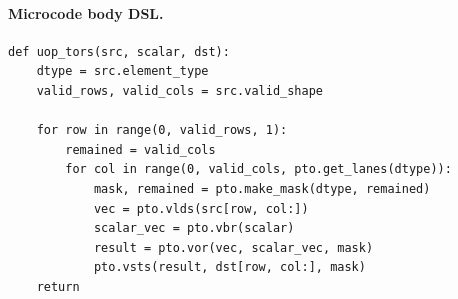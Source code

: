 \paragraph{Microcode body DSL.}
\begin{lstlisting}[style=ptocode]
def uop_tors(src, scalar, dst):
    dtype = src.element_type
    valid_rows, valid_cols = src.valid_shape

    for row in range(0, valid_rows, 1):
        remained = valid_cols
        for col in range(0, valid_cols, pto.get_lanes(dtype)):
            mask, remained = pto.make_mask(dtype, remained)
            vec = pto.vlds(src[row, col:])
            scalar_vec = pto.vbr(scalar)
            result = pto.vor(vec, scalar_vec, mask)
            pto.vsts(result, dst[row, col:], mask)
    return
\end{lstlisting}
\Needspace{0.34\textheight}
